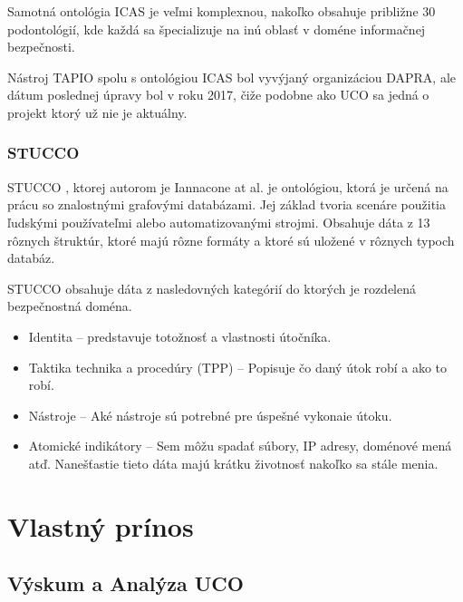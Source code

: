 \documentclass[12pt, a4paper, oneside]{book}
\begin{document}
Samotná ontológia ICAS je veľmi komplexnou, nakoľko obsahuje približne 30 podontológií, kde každá sa špecializuje na inú oblasť v doméne informačnej bezpečnosti.


Nástroj TAPIO spolu s ontológiou ICAS bol vyvýjaný organizáciou DAPRA, ale dátum poslednej úpravy bol v roku 2017, čiže podobne ako UCO sa jedná o projekt ktorý už nie je aktuálny.


\section{STUCCO}
STUCCO \citep{stucco}, ktorej autorom je Iannacone at al. je ontológiou, ktorá je určená na prácu so znalostnými grafovými databázami. Jej základ tvoria scenáre použitia ľudskými používateľmi alebo automatizovanými strojmi. Obsahuje dáta z 13 rôznych štruktúr, ktoré majú rôzne formáty a ktoré sú uložené v rôznych typoch databáz. 


STUCCO obsahuje dáta z nasledovných kategórií do ktorých je rozdelená bezpečnostná doména. 
\begin{itemize}
\item Identita -- predstavuje totožnosť a vlastnosti útočníka.
\item Taktika technika a procedúry (TPP) -- Popisuje čo daný útok robí a ako to robí.
\item Nástroje -- Aké nástroje sú potrebné pre úspešné vykonaie útoku.
\item Atomické indikátory -- Sem môžu spadať súbory, IP adresy, doménové mená atď. Nanešťastie tieto dáta majú krátku životnosť nakoľko sa stále menia.
\end{itemize}


\part{Vlastný prínos}
\chapter{Výskum a Analýza UCO}
\end{document}
